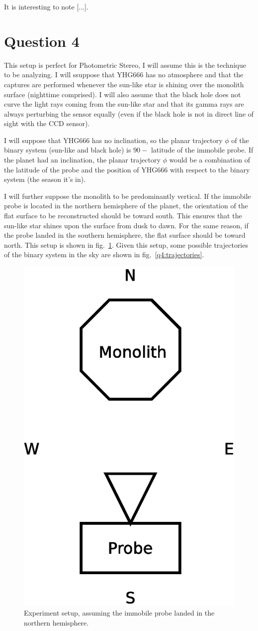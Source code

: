 \documentclass{report}
\begin{document}
It is interesting to note [...].

\section{Question 4}

This setup is perfect for Photometric Stereo, I will assume this is the technique to be analyzing. I will ssuppose that YHG666 has no atmosphere and that the captures are performed whenever the sun-like star is shining over the monolith surface (nighttime comprised). I will also assume that the black hole does not curve the light rays coming from the sun-like star and that its gamma rays are always perturbing the sensor equally (even if the black hole is not in direct line of sight with the CCD sensor).

I will suppose that YHG666 has no inclination, so the planar trajectory $\phi$ of the binary system (sun-like and black hole) is $90 -$ latitude of the immobile probe. If the planet had an inclination, the planar trajectory $\phi$ would be a combination of the latitude of the probe and the position of YHG666 with respect to the binary system (the season it's in).

I will further suppose the monolith to be predominantly vertical. If the immobile probe is located in the northern hemisphere of the planet, the orientation of the flat surface to be reconstructed should be toward south. This ensures that the sun-like star shines upon the surface from dusk to dawn. For the same reason, if the probe landed in the southern hemisphere, the flat surface should be toward north. This setup is shown in fig.~\ref{q4:setup}. Given this setup, some possible trajectories of the binary system in the sky are shown in fig.~\ref{q4:trajectories}.

\begin{figure}
  \centering
  \includegraphics[width=0.2\linewidth]{q4_setup.eps}
  \caption[Setup of the experiment]
   {Experiment setup, assuming the immobile probe landed in the northern hemisphere.}
  \label{q4:setup}
\end{figure}
\end{document}
